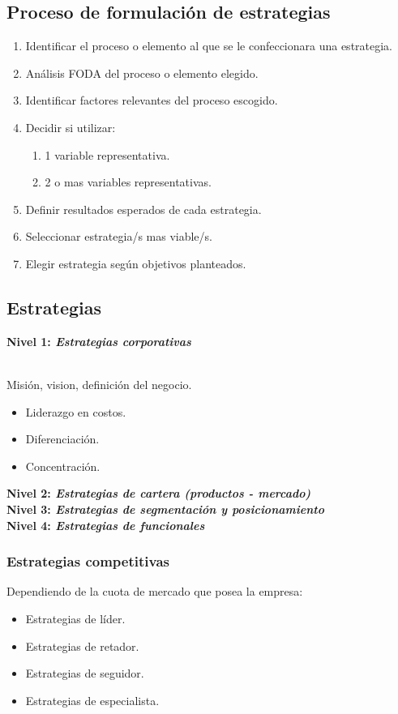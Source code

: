\documentclass{templateNote}
\begin{document}
\subsection{Proceso de formulación de estrategias}
\begin{enumerate}
    \item Identificar el proceso o elemento al que se le confeccionara una estrategia.
    \item Análisis FODA del proceso o elemento elegido.
    \item Identificar factores relevantes del proceso escogido.
    \item Decidir si utilizar:
    \begin{enumerate}
        \item 1 variable representativa.
        \item 2 o mas variables representativas.
    \end{enumerate}
    \item Definir resultados esperados de cada estrategia.
    \item Seleccionar estrategia/s mas viable/s.
    \item Elegir estrategia según objetivos planteados.
\end{enumerate}

\subsection{Estrategias}
\hypertarget{estrategia_corporativa}{\noindent\textbf{Nivel 1: \textit{Estrategias corporativas}}} \\
\indent Misión, vision, definición del negocio.
\begin{itemize}
    \item Liderazgo en costos.
    \item Diferenciación.
    \item Concentración.
\end{itemize}
\textbf{Nivel 2: \textit{Estrategias de cartera (productos - mercado)}} \\
\textbf{Nivel 3: \textit{Estrategias de segmentación y posicionamiento}} \\
\textbf{Nivel 4: \textit{Estrategias de funcionales}} \\

\subsubsection{Estrategias competitivas}
\noindent Dependiendo de la cuota de mercado que posea la empresa:
\begin{itemize}
    \item Estrategias de líder.
    \item Estrategias de retador.
    \item Estrategias de seguidor.
    \item Estrategias de especialista.
\end{itemize}
\end{document}
